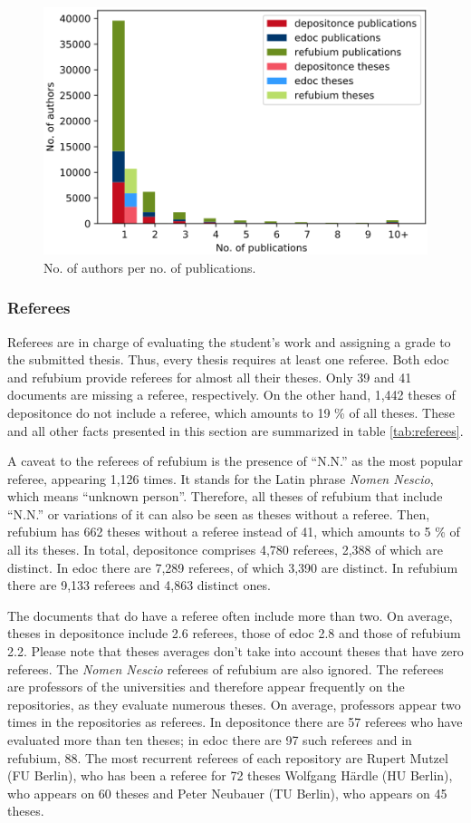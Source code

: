 \begin{figure}
    \centering
    \includegraphics[width=.7\textwidth]{figures/repository_analysis/n_publications_per_author.PNG}
    \caption{No. of authors per no. of publications.}
    \label{fig:n_publications_per_author}
\end{figure}


\subsubsection{Referees}

Referees are in charge of evaluating the student's work and assigning a grade to the submitted thesis. Thus, every thesis requires at least one referee. Both edoc and refubium provide referees for almost all their theses. Only 39 and 41 documents are missing a referee, respectively. On the other hand, 1,442 theses of depositonce do not include a referee, which amounts to 19 \% of all theses.  These and all other facts presented in this section are summarized in table \ref{tab:referees}.

A caveat to the referees of refubium is the presence of ``N.N.'' as the most popular referee, appearing 1,126 times. It stands for the Latin phrase \textit{Nomen Nescio}, which means ``unknown person''. Therefore, all theses of refubium that include ``N.N.'' or variations of it can also be seen as theses without a referee. Then, refubium has 662 theses without a referee instead of 41, which amounts to 5 \% of all its theses. In total, depositonce comprises 4,780 referees, 2,388 of which are distinct. In edoc there are 7,289 referees, of which 3,390 are distinct. In refubium there are 9,133 referees and 4,863 distinct ones.

The documents that do have a referee often include more than two. On average, theses in depositonce include 2.6 referees, those of edoc 2.8 and those of refubium 2.2. Please note that theses averages don't take into account theses that have zero referees. The \textit{Nomen Nescio} referees of refubium are also ignored. The referees are professors of the universities and therefore appear frequently on the repositories, as they evaluate numerous theses. On average, professors appear two times in the repositories as referees. In depositonce there are 57 referees who have evaluated more than ten theses; in edoc there are 97 such referees and in refubium, 88. The most recurrent referees of each repository are Rupert Mutzel (FU Berlin), who has been a referee for 72 theses Wolfgang Härdle (HU Berlin), who appears on 60 theses and Peter Neubauer (TU Berlin), who appears on 45 theses.

